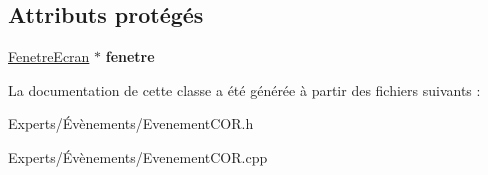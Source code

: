 \subsection*{Attributs protégés}
\begin{DoxyCompactItemize}
\item 
\mbox{\label{class_evenement_c_o_r_a45e506681a748d17833a9a0453aa0660}} 
\mbox{\hyperlink{class_fenetre_ecran}{Fenetre\+Ecran}} $\ast$ {\bfseries fenetre}
\end{DoxyCompactItemize}


La documentation de cette classe a été générée à partir des fichiers suivants \+:\begin{DoxyCompactItemize}
\item 
Experts/Évènements/Evenement\+C\+O\+R.\+h\item 
Experts/Évènements/Evenement\+C\+O\+R.\+cpp\end{DoxyCompactItemize}
